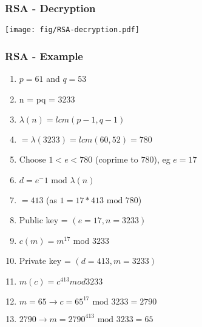 \documentclass[
hyperref={pdfpagelabels=false}
,xcolor=table
]
{beamer}
\begin{document}
\begin{frame}
  \frametitle{RSA - Decryption}

  \begin{center}
    \texttt{[image: fig/RSA-decryption.pdf]}
  \end{center}
\end{frame}




  

\begin{frame}
  \frametitle{RSA - Example}
  \begin{enumerate}
  \item $p = 61$ and $q = 53$
  \item n = pq = 3233
  \item $\lambda(n) = lcm(p-1, q-1)$
  \item $= \lambda(3233) = lcm(60,52) = 780$
  \item Choose $1<e<780$ (coprime to $780$), eg $e=17$
  \item $d = e^-1 \mbox{ mod } \lambda(n)$
  \item $= 413$ (as $1 = 17 * 413 \mbox{ mod } 780$)
  \item Public key = $(e = 17, n = 3233)$
  \item $c(m) = m^{17} \mbox { mod } 3233$
  \item Private key = $(d = 413, m = 3233)$
  \item $m(c) = c^{413} mod 3233$
  \item $m = 65 \rightarrow c = 65^{17} \mbox{ mod } 3233 = 2790$
  \item $2790 \rightarrow m = 2790^{413} \mbox{ mod } 3233 = 65$
  \end{enumerate}
  
\end{frame}
\end{document}

